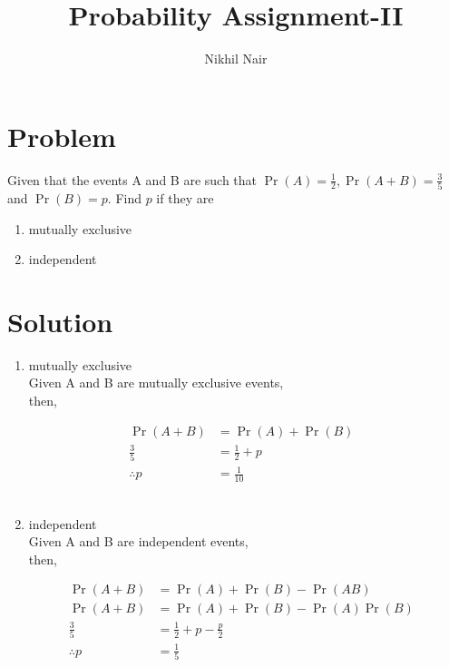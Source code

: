 \documentclass[journal,12pt,twocolumn]{IEEEtran}
\title{\mytitle}
\title{
Probability Assignment-II
}
\author{Nikhil Nair}
\providecommand{\pr}[1]{\ensuremath{\Pr\left(#1\right)}}
\begin{document}
\maketitle
\bigskip



\section{\textbf{Problem }}
Given that the events A and B are such that $\pr{A}=\frac{1}{2}, \pr{A + B}=\frac{3}{5}$ and $\pr{B}=p$. Find $p$ if they are \\
\begin{enumerate}
    \item mutually exclusive
    \item independent
\end{enumerate}


\section{\textbf{Solution }}
\begin{enumerate}
\item mutually exclusive
\\
Given A and B are mutually exclusive events,\\
then,

\begin{align}
\pr{A + B} &=\pr{A} + \pr{B}&
\\
\frac{3}{5}&=\frac{1}{2}+p&
\\
\therefore  p &= \frac{1}{10}&
\end{align}
\\

\item independent
\\
Given A and B are independent events,\\
then,

\begin{align}
\pr{A + B} &=\pr{A} + \pr{B} - \pr{A B}& 
\\
\pr{A + B} &=\pr{A} + \pr{B} - \pr{A}\pr{B}&
\\
\frac{3}{5}&=\frac{1}{2}+ p - \frac{p}{2}&
\\
\therefore p &= \frac{1}{5}&
\end{align}

\end{enumerate}
\end{document}
